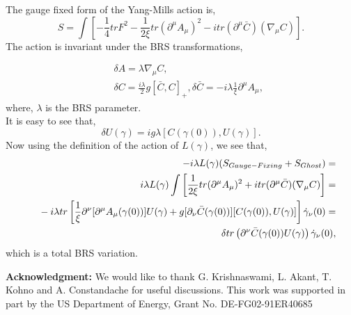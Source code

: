 \documentclass[a4paper,12]{article}
\begin{document}
The gauge fixed form of the Yang-Mills action is,
\begin{equation}
S = \int \left[-\frac{1}{4}tr F^2 -\frac{1}{2\xi }tr(\partial ^{\mu }A_\mu 
)^2 -i tr(\partial ^\mu \bar{C})(\nabla _\mu C)\right].
\end{equation}
The action is invariant under the BRS transformations,

\begin{eqnarray}
& &\delta A = \lambda \nabla _\mu C ,\\
& & \delta C = \frac {i\lambda }{2}g[\bar{C},C]_+, \delta \bar{C} = 
-i\lambda \frac{1}{\xi }\partial ^\mu A_\mu,
\end{eqnarray}
where, $\lambda $ is the BRS parameter.\\

It is easy to see that,
\begin{equation}
\delta U(\gamma ) = ig\lambda [C(\gamma (0)),U(\gamma )].
\end{equation}
Now using the definition of the action of $L(\gamma )$, we see that,
\begin{eqnarray}
&&-i\lambda L(\gamma )(S_{Gauge-Fixing} + S_{Ghost}) = \nonumber\\
&&\hbox{ }i\lambda L(\gamma 
)\int 
\left[ \frac{1}{2\xi }tr(\partial ^{\mu 
}A_\mu
)^2 +i tr(\partial ^\mu \bar{C})(\nabla _\mu C)\right] =\nonumber \\
&&\hbox{ }-i\lambda tr 
\left[ \frac{1}{\xi }\partial ^\nu [\partial ^\mu A_\mu(\gamma 
(0))]U(\gamma ) + g[\partial _\nu \bar{C}(\gamma (0))][C(\gamma (0)), 
U(\gamma )]\right]\dot{\gamma }_\nu (0) =\nonumber \\
&&\hbox{ }\delta tr\left(\partial ^\nu \bar{C}(\gamma (0))U(\gamma 
)\right)\dot{\gamma }_\nu (0),
\end{eqnarray}
which is a total BRS variation.

{\bf Acknowledgment:}  We would like to thank G. Krishnaswami, 
L. Akant, T. Kohno and A. Constandache for useful discussions. This work 
was supported in 
part by the US 
Department of
Energy, Grant No. DE-FG02-91ER40685 



\end{document}
